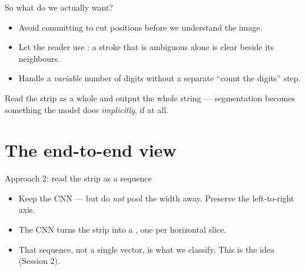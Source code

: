 \documentclass[10pt,aspectratio=169]{beamer}
\begin{document}
\begin{frame}{So what do we actually want?}
  \begin{itemize}
    \item Avoid committing to cut positions before we understand the image.
    \item Let the reader use : a stroke that is ambiguous alone is clear beside its neighbours.
    \item Handle a \emph{variable} number of digits without a separate ``count the digits'' step.
  \end{itemize}
  \begin{goodbox}
    Read the strip as a whole and output the whole string --- segmentation becomes something the
    model does \emph{implicitly}, if at all.
  \end{goodbox}
\end{frame}

\section{The end-to-end view}

\begin{frame}{Approach 2: read the strip as a sequence}
  \begin{center}
  \end{center}
  \begin{itemize}
    \item Keep the CNN --- but do \emph{not} pool the width away. Preserve the left-to-right axis.
    \item The CNN turns the strip into a , one per horizontal slice.
    \item That sequence, not a single vector, is what we classify. This is the  idea (Session 2).
  \end{itemize}
\end{frame}
\end{document}
